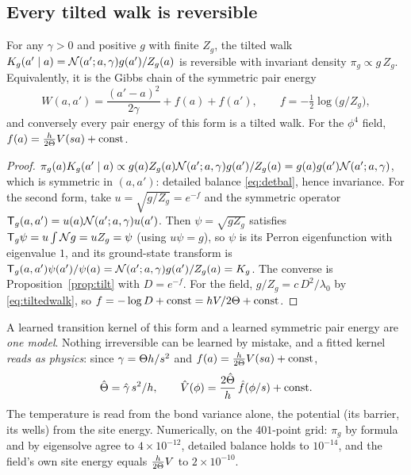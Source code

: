 \subsection{Every tilted walk is reversible}

\begin{proposition}\label{prop:rev}
For any $\gamma>0$ and positive $g$ with finite $Z_g$, the tilted walk $K_g(a'\mid a)=\mathcal{N}(a';a,\gamma)g(a')/Z_g(a)$ is
reversible with invariant density $\pi_g\propto g\,Z_g$. Equivalently, it is the Gibbs chain of the symmetric pair energy
\begin{equation}\label{eq:pairenergy}
  W(a,a')=\frac{(a'-a)^2}{2\gamma}+f(a)+f(a'),\qquad f=-\tfrac12\log\big(g/Z_g\big),
\end{equation}
and conversely every pair energy of this form is a tilted walk. For the $\phi^4$ field, $f(a)=\tfrac{h}{2\Theta}V(sa)+\text{const}$.
\end{proposition}
\begin{proof}
$\pi_g(a)K_g(a'\mid a)\propto g(a)Z_g(a)\mathcal{N}(a';a,\gamma)g(a')/Z_g(a)=g(a)g(a')\mathcal{N}(a';a,\gamma)$, which is symmetric in $(a,a')$: detailed
balance \eqref{eq:detbal}, hence invariance. For the second form, take $u=\sqrt{g/Z_g}=e^{-f}$ and the symmetric operator
$\mathsf T_g(a,a')=u(a)\mathcal{N}(a';a,\gamma)u(a')$. Then $\psi=\sqrt{gZ_g}$ satisfies $\mathsf T_g\psi=u\int\mathcal{N} g=uZ_g=\psi$ (using $u\psi=g$), so $\psi$ is
its Perron eigenfunction with eigenvalue $1$, and its ground-state transform is
$\mathsf T_g(a,a')\psi(a')/\psi(a)=\mathcal{N}(a';a,\gamma)g(a')/Z_g(a)=K_g$. The converse is Proposition~\ref{prop:tilt} with $D=e^{-f}$. For the
field, $g/Z_g=c\,D^2/\lambda_0$ by \eqref{eq:tiltedwalk}, so $f=-\log D+\text{const}=hV/2\Theta+\text{const}$.
\end{proof}

\begin{keyidea}
A learned transition kernel of this form and a learned symmetric pair energy are \emph{one model}. Nothing
irreversible can be learned by mistake, and a fitted kernel \emph{reads as physics}: since $\gamma=\Theta h/s^2$ and
$f(a)=\tfrac{h}{2\Theta}V(sa)+\text{const}$,
\begin{equation}\label{eq:readout}
  \hat{\Theta}=\hat\gamma\,s^2/h,\qquad\hat V(\phi)=\frac{2\hat{\Theta}}{h}\,\hat f(\phi/s)+\text{const}.
\end{equation}
The temperature is read from the bond variance alone, the potential (its barrier, its wells) from the site
energy. Numerically, on the $401$-point grid: $\pi_g$ by formula and by eigensolve agree to $4\times10^{-12}$,
detailed balance holds to $10^{-14}$, and the field's own site energy equals $\tfrac h{2\Theta}V$ to $2\times10^{-10}$.
\end{keyidea}

